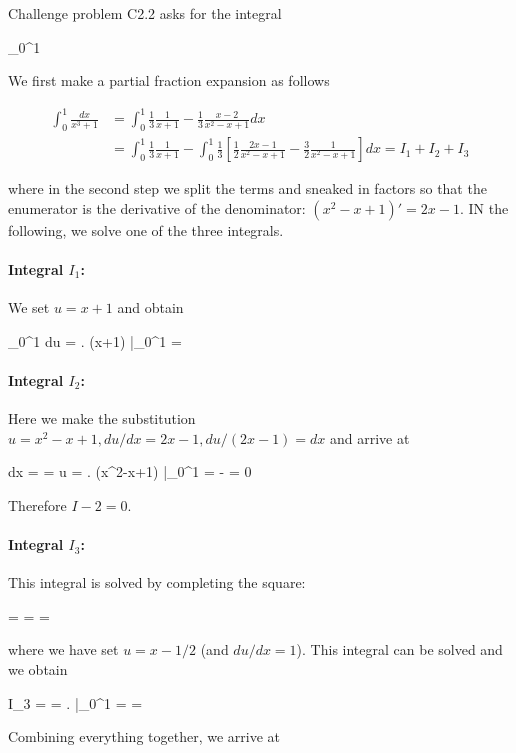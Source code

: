 
Challenge problem C2.2 asks for the integral

\bee
\int_0^1 
\eee

We first make a partial fraction expansion as follows

\begin{align*}
\int_0^1 \frac{dx}{x^3+1} &= \int_0^1 \frac{1}{3}\frac{1}{x+1} - \frac{1}{3}\frac{x-2}{x^2-x+1} dx \\ &= \int_0^1 \frac{1}{3}\frac{1}{x+1} - \int_0^1 \frac{1}{3} \left[ \frac{1}{2} \frac{2x-1}{x^2-x+1} - \frac{3}{2} \frac{1}{x^2-x+1} \right] dx = I_1 + I_2 + I_3
\end{align*}

where in the second step we split the terms and sneaked in factors so that the enumerator is the derivative of the denominator: $(x^2 - x+1)' = 2x-1$. IN the following, we solve one of the three integrals.

\paragraph{Integral $I_1$:} We set $u=x+1$ and obtain

\bee
\int_0^1  du =  \left. \ln (x+1) \right|_0^1 =  
\eee

\paragraph{Integral $I_2$:} Here we make the substitution $u = x^2-x+1, du/dx = 2x-1, du/(2x-1) = dx$ and arrive at

\bee
\int {} dx = \int {}  = \ln u = \left. \ln(x^2-x+1) \right|_0^1 =  -  = 0
\eee

Therefore $I-2 = 0$.

\paragraph{Integral $I_3$:} This integral is solved by completing the square:

\bee
\int {} = \int {} = \int {} = \int {}
\eee

where we have set $u=x-1/2$ (and $du/dx=1$). This integral can be solved and we obtain

\bee
I_3 =   = \left.  \right|_0^1 = \cdots = 
\eee

Combining everything together, we arrive at

\bee
{}
\eee
